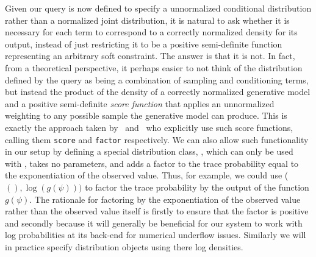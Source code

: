 Given our query is now defined to specify a unnormalized conditional distribution rather than a normalized
joint distribution, it is natural to ask whether it is necessary for each \observe term to correspond to
a correctly normalized density for its output, instead of just restricting it to be a positive semi-definite
function representing an arbitrary soft constraint.  The answer is that it is not.  In fact, from a theoretical perspective,
it perhaps easier to not think of the distribution defined by the query as being a combination of sampling and conditioning terms,
but instead the product of the density of a correctly normalized generative
model and a positive semi-definite \emph{score function} that applies an unnormalized weighting to any possible
sample the generative model can produce.  This is
exactly the approach taken by~\citep{staton2016semantics} and~\citep{goodman_book_2014} who explicitly use such
score functions, calling them {\small \texttt{score}} and {\small \texttt{factor}} respectively.
We can also allow such functionality in our setup by defining a
special distribution class, \boppfactor, which can only be used with \observe, takes no parameters, and 
adds a factor to the trace probability equal to the exponentiation of the observed value.  Thus, for example, we could use
\observe (\boppfactor$(),\log(g(\psi)))$ to factor the trace probability by the output of the function $g(\psi)$.
The rationale for factoring by the exponentiation of the observed value rather than the observed value itself
is firstly to ensure that the factor is positive and secondly because it will generally be beneficial for
our system to work with log probabilities at its back-end for numerical underflow issues.  Similarly
we will in practice specify distribution objects using there log densities.

